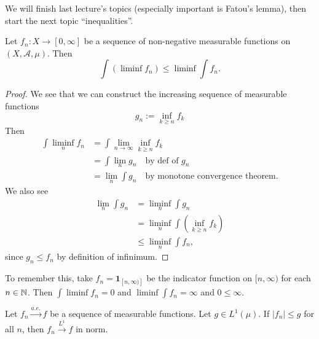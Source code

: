 

We will finish last lecture's topics (especially important is Fatou's
lemma), then start the next topic ``inequalities''.

\begin{lemma}[Fatou]
Let $f_{n}\colon X\to[0,\infty]$ be a sequence of non-negative
measurable functions on $(X,\mathcal{A},\mu)$. Then
\begin{equation}
\int(\liminf f_{n})\leq\liminf\int f_{n}.
\end{equation}
\end{lemma}

\begin{proof}
We see that we can construct the increasing sequence of measurable functions
\begin{equation}
g_{n} := \inf_{k\geq n}f_{k}
\end{equation}
Then
\begin{subequations}
  \begin{align}
\int\liminf_{n}f_{n} &= \int\lim_{n\to\infty}\inf_{k\geq n}f_{k}\\
&=\int\lim_{n}g_{n}\quad\mbox{by def of $g_{n}$}\\
&=\lim_{n}\int g_{n}\quad\mbox{by monotone convergence theorem}.
  \end{align}
\end{subequations}
We also see
\begin{subequations}
  \begin{align}
    \lim_{n}\int g_{n} &= \liminf_{n}\int g_{n}\\
    &= \liminf_{n}\int(\inf_{k\geq n}f_{k})\\
    &\leq \liminf_{n}\int f_{n},
  \end{align}
\end{subequations}
since $g_{n}\leq f_{n}$ by definition of infinimum.
\end{proof}

\begin{example}
To remember this, take $f_{n}=\mathbf{1}_{[n,\infty)]}$ be the
indicator function on $[n,\infty)$ for each $n\in\mathbb{N}$. Then
  $\int\liminf f_{n}=0$ and $\liminf\int f_{n}=\infty$ and $0\leq\infty$.
\end{example}

\begin{theorem}
Let $f_{n}\xrightarrow{a.e.}f$ be a sequence of measurable functions.
Let $g\in L^{1}(\mu)$. If $|f_{n}|\leq g$ for all $n$, then
$f_{n}\xrightarrow{L^{1}}f$ in norm.
\end{theorem}


